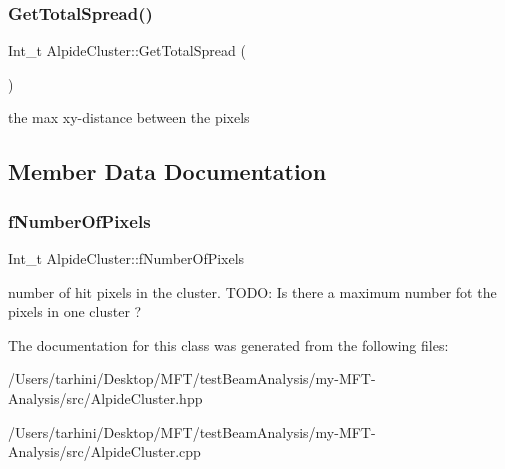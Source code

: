 \subsubsection{\texorpdfstring{Get\+Total\+Spread()}{GetTotalSpread()}}
{\footnotesize\ttfamily Int\+\_\+t Alpide\+Cluster\+::\+Get\+Total\+Spread (\begin{DoxyParamCaption}{ }\end{DoxyParamCaption})}

the max xy-\/distance between the pixels 

\subsection{Member Data Documentation}
\mbox{\label{class_alpide_cluster_a201c3e825ff2d703e7d18d05c801495d}} 
\subsubsection{\texorpdfstring{f\+Number\+Of\+Pixels}{fNumberOfPixels}}
{\footnotesize\ttfamily Int\+\_\+t Alpide\+Cluster\+::f\+Number\+Of\+Pixels\hspace{0.3cm}{\ttfamily [private]}}

number of hit pixels in the cluster. T\+O\+DO\+: Is there a maximum number fot the pixels in one cluster ? 

The documentation for this class was generated from the following files\+:\begin{DoxyCompactItemize}
\item 
/\+Users/tarhini/\+Desktop/\+M\+F\+T/test\+Beam\+Analysis/my-\/\+M\+F\+T-\/\+Analysis/src/Alpide\+Cluster.\+hpp\item 
/\+Users/tarhini/\+Desktop/\+M\+F\+T/test\+Beam\+Analysis/my-\/\+M\+F\+T-\/\+Analysis/src/Alpide\+Cluster.\+cpp\end{DoxyCompactItemize}
